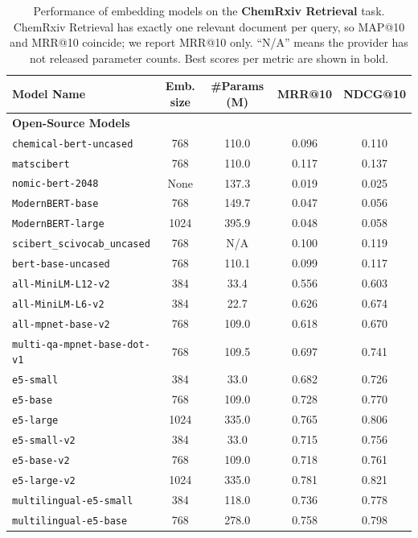 \begin{table}[!t]
\centering \small
\caption{Performance of embedding models on the \textbf{ChemRxiv Retrieval} task. ChemRxiv Retrieval has exactly one relevant document per query, so MAP@10 and MRR@10 coincide; we report MRR@10 only. “N/A” means the provider has not released parameter counts. Best scores per metric are shown in bold.}
\label{tab:chemrxiv-results}
\begin{tabular}{lcccc}
\toprule
Model Name & Emb. size & \#Params (M) & MRR@10 & NDCG@10 \\
\midrule
    \multicolumn{5}{l}{\textbf{Open-Source Models}}\\
    \texttt{chemical-bert-uncased} & 768 & 110.0 & 0.096 & 0.110 \\
    \texttt{matscibert} & 768 & 110.0 & 0.117 & 0.137 \\
    \texttt{nomic-bert-2048} & None & 137.3 & 0.019 & 0.025 \\
    \texttt{ModernBERT-base} & 768 & 149.7 & 0.047 & 0.056 \\
    \texttt{ModernBERT-large} & 1024 & 395.9 & 0.048 & 0.058 \\
    \texttt{scibert\_scivocab\_uncased} & 768 & N/A & 0.100 & 0.119 \\
    \texttt{bert-base-uncased} & 768 & 110.1 & 0.099 & 0.117 \\
    \texttt{all-MiniLM-L12-v2} & 384 & 33.4 & 0.556 & 0.603 \\
    \texttt{all-MiniLM-L6-v2} & 384 & 22.7 & 0.626 & 0.674 \\
    \texttt{all-mpnet-base-v2} & 768 & 109.0 & 0.618 & 0.670 \\
    \texttt{multi-qa-mpnet-base-dot-v1} & 768 & 109.5 & 0.697 & 0.741 \\
    \texttt{e5-small} & 384 & 33.0 & 0.682 & 0.726 \\
    \texttt{e5-base} & 768 & 109.0 & 0.728 & 0.770 \\
    \texttt{e5-large} & 1024 & 335.0 & 0.765 & 0.806 \\
    \texttt{e5-small-v2} & 384 & 33.0 & 0.715 & 0.756 \\
    \texttt{e5-base-v2} & 768 & 109.0 & 0.718 & 0.761 \\
    \texttt{e5-large-v2} & 1024 & 335.0 & 0.781 & 0.821 \\
    \texttt{multilingual-e5-small} & 384 & 118.0 & 0.736 & 0.778 \\
    \texttt{multilingual-e5-base} & 768 & 278.0 & 0.758 & 0.798 \\

\end{tabular}
\end{table}
